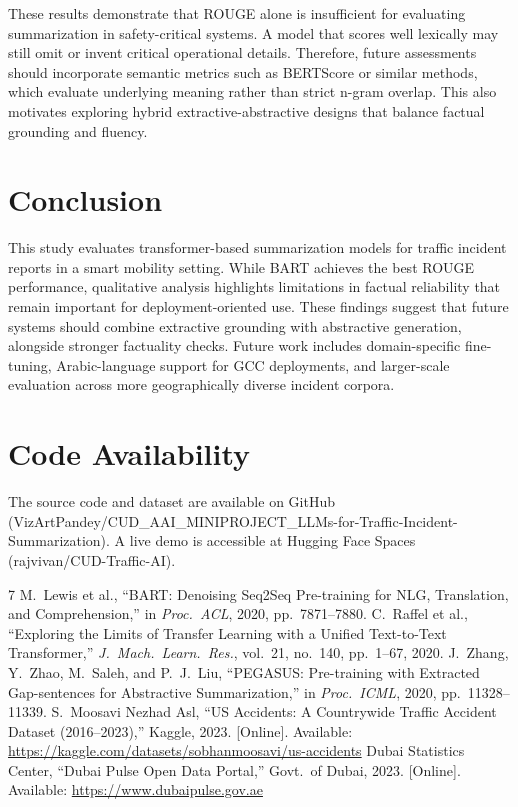 \documentclass[10pt,conference]{IEEEtran}
\begin{document}
These results demonstrate that ROUGE alone is insufficient for
evaluating summarization in safety-critical systems. A model that scores
well lexically may still omit or invent critical operational details.
Therefore, future assessments should incorporate semantic metrics such as BERTScore or similar methods, which evaluate underlying meaning rather than strict n-gram overlap. This also motivates exploring hybrid
extractive-abstractive designs that balance factual grounding and
fluency.

\section{Conclusion}
\vspace{-1mm}

This study evaluates transformer-based summarization models for traffic
incident reports in a smart mobility setting. While BART achieves the
best ROUGE performance, qualitative analysis highlights limitations in
factual reliability that remain important for deployment-oriented use.
These findings suggest that future systems should combine extractive
grounding with abstractive generation, alongside stronger factuality
checks. Future work includes domain-specific fine-tuning,
Arabic-language support for GCC deployments, and larger-scale evaluation
across more geographically diverse incident corpora.

\section*{Code Availability}
The source code and dataset are available on GitHub (VizArtPandey/CUD\_AAI\_MINIPROJECT\_LLMs-for-Traffic-Incident-Summarization).
A live demo is accessible at Hugging Face Spaces (rajvivan/CUD-Traffic-AI).

\vspace{-3mm}
\begin{thebibliography}{7}
\footnotesize
{}
M.~Lewis et al.,
``BART: Denoising Seq2Seq Pre-training for NLG, Translation, and Comprehension,''
in \textit{Proc.\ ACL}, 2020, pp.\ 7871--7880.
C.~Raffel et al.,
``Exploring the Limits of Transfer Learning with a Unified Text-to-Text Transformer,''
\textit{J.\ Mach.\ Learn.\ Res.}, vol.~21, no.~140, pp.~1--67, 2020.
J.~Zhang, Y.~Zhao, M.~Saleh, and P.~J.~Liu,
``PEGASUS: Pre-training with Extracted Gap-sentences for Abstractive Summarization,''
in \textit{Proc.\ ICML}, 2020, pp.~11328--11339.
S.~Moosavi Nezhad Asl,
``US Accidents: A Countrywide Traffic Accident Dataset (2016--2023),''
Kaggle, 2023. [Online]. Available: \url{https://kaggle.com/datasets/sobhanmoosavi/us-accidents}
Dubai Statistics Center,
``Dubai Pulse Open Data Portal,''
Govt.\ of Dubai, 2023. [Online]. Available: \url{https://www.dubaipulse.gov.ae}
\end{thebibliography}
\end{document}

